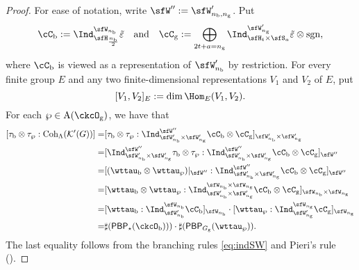 \documentclass[12pt,a4paper]{amsart}
\newcommand{\CK}{{\mathcal {K}}}
\newcommand{\sgn}{\operatorname{sgn}}
\numberwithin{equation}{section}
\theoremstyle{remark}
\def\Coh{\mathrm{Coh}}
\def\PBP{\mathsf{PBP}}
\def\ckcOb{\ckcO_{\mathrm b}}
\def\ckcOg{\ckcO_{\mathrm g}}
\def\Gg{G_{\mathrm g}}
\begin{document}
\begin{proof}
  For ease of notation, write $\sfW'':=\sfW_{n_{\mathrm b},n_{\mathrm g}}'$. Put
  \[
    \cC_{\mathrm b}:=   \Ind_{\sfH_{\frac{n_\mathrm b}{2}}}^{\sfW_{n_\mathrm b}}\tilde{\varepsilon} \quad\textrm{and}\quad  \cC_\mathrm g:=  \bigoplus_{\substack{2t+a=n_\mathrm g}} \Ind_{\sfH_{t} \times \sfS_{a}}^{\sfW'_{n_\mathrm g}}
         \tilde{\varepsilon} \otimes \sgn,
           \]
           where $\cC_\mathrm b$ is viewed as a representation of $\sfW_{n_\mathrm b}'$ by restriction.
   For every finite group $E$ and any  two finite-dimensional  representations $V_1$ and $V_2$ of $E$, put
  \[
    [V_1, V_2]_E:=\dim \Hom_E(V_1, V_2).
  \]
   For each $\wp\in \mathrm A (\ckcOg)$, we have that
  \[
    \begin{split}
    [\tau_{\mathrm b}\otimes \tau_{\wp}: \Coh_{\Lambda} (\CK'(G))]
      = & [\tau_{\mathrm b}\otimes \tau_{\wp} :
      \Ind_{\sfW'_{n_{\mathrm b}}\times \sfW'_{n_{\mathrm g}}}^{\sfW''} \cC_{\mathrm b} \otimes \cC_{\mathrm g}]_{\sfW'_{n_{\mathrm b}}\times \sfW'_{n_{\mathrm g}}}\\
      = & [\Ind_{\sfW'_{n_{\mathrm b}}\times \sfW'_{n_{\mathrm g}}}^{\sfW''} \tau_{\mathrm b}\otimes \tau_{\wp} :
      \Ind_{\sfW'_{n_{\mathrm b}}\times \sfW'_{n_{\mathrm g}}}^{\sfW''} \cC_{\mathrm b} \otimes \cC_{\mathrm g}]_{\sfW''}\\
      = & [(\wttau_{\mathrm b}\otimes \wttau_{\wp})|_{\sfW''}:
      \Ind_{\sfW'_{n_{\mathrm b}}\times \sfW'_{n_{\mathrm g}}}^{\sfW''} \cC_{\mathrm b} \otimes \cC_{\mathrm g}]_{\sfW''}\\
      = & [\wttau_{\mathrm b}\otimes \wttau_{\wp}:
      \Ind_{\sfW'_{n_{\mathrm b}}\times \sfW'_{n_{\mathrm g}}}^{\sfW_{n_{\mathrm b}}\times \sfW_{n_{\mathrm g}}} \cC_{\mathrm b} \otimes \cC_{\mathrm g}]_{\sfW_{n_{\mathrm b}}\times \sfW_{n_{\mathrm g}}}\\
       = & [\wttau_{\mathrm b}:\Ind_{\sfW'_{n_{\mathrm b}}}^{\sfW_{n_{\mathrm b}}} \cC_{\mathrm b}]_{\sfW_{n_{\mathrm b}}}\cdot
           [\wttau_{\wp}:\Ind_{\sfW'_{n_{\mathrm g}}}^{\sfW_{n_{\mathrm g}}} \cC_{\mathrm g}]_{\sfW_{n_{\mathrm g}}}\\
      =& \sharp(\PBP_{\star}(\ckcOb)))\cdot \sharp(\PBP_{\Gg}(\wttau_{\wp})).
    \end{split}
  \]
  The last equality follows from the branching rules
  \eqref{eq:indSW} and
  Pieri's rule (\cite[Corollary 9.2.4]{GW}).
\end{proof}
\end{document}
